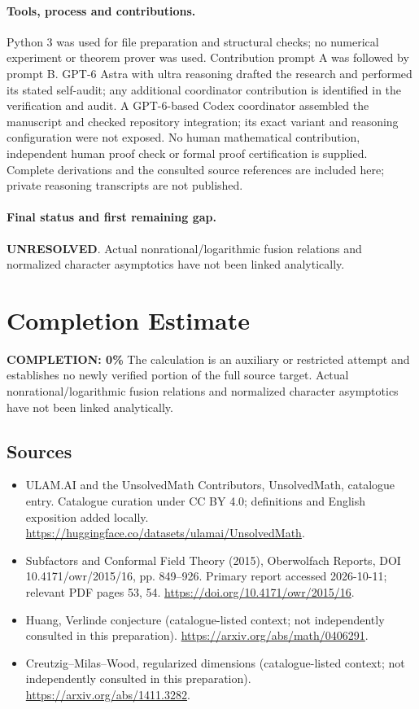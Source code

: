 \documentclass[11pt]{article}
\begin{document}
\paragraph{Tools, process and contributions.}
Python 3 was used for file preparation and structural checks; no numerical experiment or theorem prover was used. Contribution prompt A was followed by prompt B. GPT-6 Astra with ultra reasoning drafted the research and performed its stated self-audit; any additional coordinator contribution is identified in the verification and audit. A GPT-6-based Codex coordinator assembled the manuscript and checked repository integration; its exact variant and reasoning configuration were not exposed. No human mathematical contribution, independent human proof check or formal proof certification is supplied. Complete derivations and the consulted source references are included here; private reasoning transcripts are not published.

\paragraph{Final status and first remaining gap.}
\textbf{UNRESOLVED}. Actual nonrational/logarithmic fusion relations and normalized character asymptotics have not been linked analytically.

\section{Completion Estimate}
\noindent\textbf{COMPLETION: 0\%}
The calculation is an auxiliary or restricted attempt and establishes no newly verified portion of the full source target. Actual nonrational/logarithmic fusion relations and normalized character asymptotics have not been linked analytically.

\subsection{Sources}
\begin{itemize}
\item[\hypertarget{source:statement:1}{S1}] ULAM.AI and the UnsolvedMath Contributors, UnsolvedMath, catalogue entry. Catalogue curation under CC BY 4.0; definitions and English exposition added locally.
\url{https://huggingface.co/datasets/ulamai/UnsolvedMath}.
\item[\hypertarget{source:statement:2}{S2}] Subfactors and Conformal Field Theory (2015), Oberwolfach Reports, DOI 10.4171/owr/2015/16, pp. 849--926. Primary report accessed 2026-10-11; relevant PDF pages 53, 54.
\url{https://doi.org/10.4171/owr/2015/16}.
\item[\hypertarget{source:statement:3}{S3}] Huang, Verlinde conjecture (catalogue-listed context; not independently consulted in this preparation).
\url{https://arxiv.org/abs/math/0406291}.
\item[\hypertarget{source:statement:4}{S4}] Creutzig--Milas--Wood, regularized dimensions (catalogue-listed context; not independently consulted in this preparation).
\url{https://arxiv.org/abs/1411.3282}.
\end{itemize}
\label{end:statement}
\end{document}
